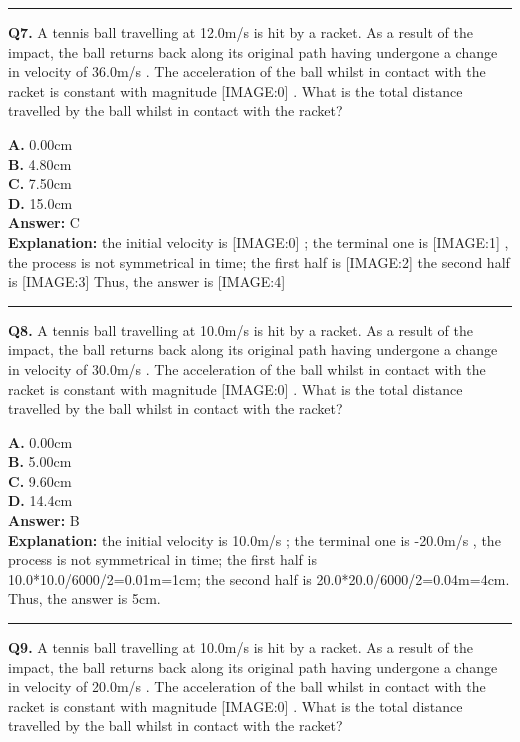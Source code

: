 \documentclass[12pt]{article}
\begin{document}
\hrule
\vspace{1em}


\noindent
\textbf{Q7.} A tennis ball travelling at 12.0m/s
is hit by a racket. As a result of the impact, the ball returns back along its original path having undergone a change in velocity of 36.0m/s
. The acceleration of the ball whilst in contact with the racket is constant with magnitude
[IMAGE:0]
.
What is the total distance travelled by the ball whilst in contact with the racket?



\textbf{A.} 0.00cm \\
\textbf{B.} 4.80cm \\
\textbf{C.} 7.50cm \\
\textbf{D.} 15.0cm \\

\textbf{Answer:} C \\
\textbf{Explanation:} the initial velocity is
[IMAGE:0]
; the terminal one is
[IMAGE:1]
, the process is not symmetrical in time;
the first half is
[IMAGE:2]
the second half is
[IMAGE:3]
Thus, the answer is
[IMAGE:4]

\hrule
\vspace{1em}


\noindent
\textbf{Q8.} A tennis ball travelling at 10.0m/s
is hit by a racket. As a result of the impact, the ball returns back along its original path having undergone a change in velocity of 30.0m/s
. The acceleration of the ball whilst in contact with the racket is constant with magnitude
[IMAGE:0]
.
What is the total distance travelled by the ball whilst in contact with the racket?



\textbf{A.} 0.00cm \\
\textbf{B.} 5.00cm \\
\textbf{C.} 9.60cm \\
\textbf{D.} 14.4cm \\

\textbf{Answer:} B \\
\textbf{Explanation:} the initial velocity is 10.0m/s ; the terminal one is -20.0m/s , the process is not symmetrical in time; the first half is 10.0*10.0/6000/2=0.01m=1cm; the second half is 20.0*20.0/6000/2=0.04m=4cm. Thus, the answer is 5cm.

\hrule
\vspace{1em}


\noindent
\textbf{Q9.} A tennis ball travelling at 10.0m/s
is hit by a racket. As a result of the impact, the ball returns back along its original path having undergone a change in velocity of 20.0m/s
. The acceleration of the ball whilst in contact with the racket is constant with magnitude
[IMAGE:0]
.
What is the total distance travelled by the ball whilst in contact with the racket?
\end{document}
